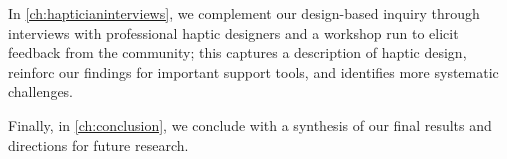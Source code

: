 In \autoref{ch:hapticianinterviews}, we complement our design-based inquiry through interviews with professional haptic designers and a workshop run to elicit feedback from the community; this captures a description of haptic design, reinforc our findings for important support tools, and identifies more systematic challenges.

Finally, in \autoref{ch:conclusion}, we conclude with a synthesis of our final results and directions for future research.


%
%
\endinput

Any text after an \endinput is ignored.
You could put scraps here or things in progress.
